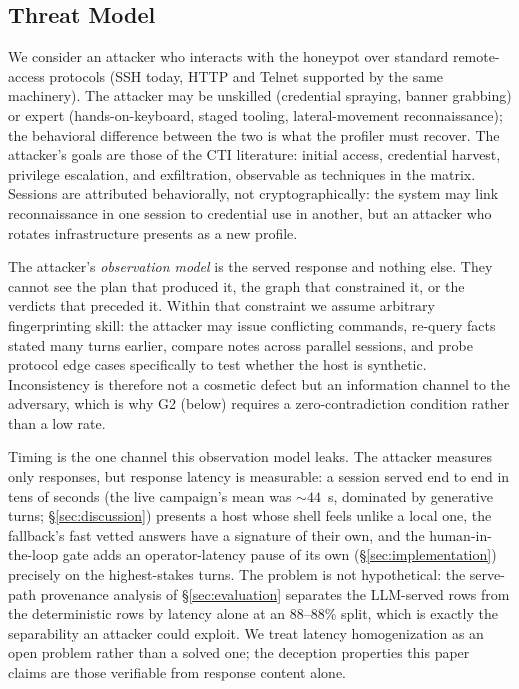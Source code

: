 \subsection{Threat Model}
\label{sec:threatmodel}
We consider an attacker who interacts with the honeypot over standard
remote-access protocols (SSH today, HTTP and Telnet supported by the same
machinery). The attacker may be unskilled (credential spraying, banner
grabbing) or expert (hands-on-keyboard, staged tooling, lateral-movement
reconnaissance); the behavioral difference between the two is what the
profiler must recover. The attacker's goals are those of the CTI
literature: initial access, credential harvest, privilege escalation, and
exfiltration, observable as techniques in the \attck matrix. Sessions are
attributed behaviorally, not cryptographically: the system may link
reconnaissance in one session to credential use in another, but an
attacker who rotates infrastructure presents as a new profile.

The attacker's \emph{observation model} is the served response and
nothing else. They cannot see the plan that produced it, the graph that
constrained it, or the verdicts that preceded it. Within that constraint
we assume arbitrary fingerprinting skill: the attacker may issue
conflicting commands, re-query facts stated many turns earlier, compare
notes across parallel sessions, and probe protocol edge cases
specifically to test whether the host is synthetic. Inconsistency is
therefore not a cosmetic defect but an information channel to the
adversary, which is why G2 (below) requires a zero-contradiction
condition rather than a low rate.

Timing is the one channel this observation model leaks. The attacker
measures only responses, but response latency is measurable: a
session served end to end in tens of seconds (the live campaign's mean
was ${\sim}44$~s, dominated by generative turns; \S\ref{sec:discussion})
presents a host whose shell feels unlike a local one, the
fallback's fast vetted answers have a signature of their own, and the
human-in-the-loop gate adds an operator-latency pause of its own
(\S\ref{sec:implementation}) precisely on the highest-stakes turns. The
problem is not hypothetical: the serve-path provenance analysis of
\S\ref{sec:evaluation} separates the LLM-served rows from the
deterministic rows by latency alone at an 88--88\% split, which is
exactly the separability an attacker could exploit. We treat
latency homogenization as an open problem rather than a solved one; the
deception properties this paper claims are those verifiable from
response content alone.


